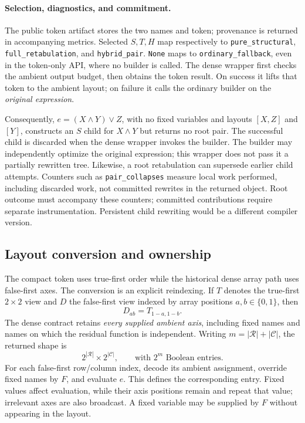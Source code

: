 \documentclass[10pt]{article}
\theoremstyle{plain}
\theoremstyle{definition}
\theoremstyle{remark}
\begin{document}
\paragraph{Selection, diagnostics, and commitment.}
The public token artifact stores the two names and token; provenance is returned in accompanying metrics. Selected $S,T,H$ map respectively to \texttt{pure\_structural}, \texttt{full\_retabulation}, and \texttt{hybrid\_pair}. \texttt{None} maps to \texttt{ordinary\_fallback}, even in the token-only API, where no builder is called. The dense wrapper first checks the ambient output budget, then obtains the token result. On success it lifts that token to the ambient layout; on failure it calls the ordinary builder on the \emph{original expression}.

Consequently, $e=(X\land Y)\lor Z$, with no fixed variables and layouts $[X,Z]$ and $[Y]$, constructs an $S$ child for $X\land Y$ but returns no root pair. The successful child is discarded when the dense wrapper invokes the builder. The builder may independently optimize the original expression; this wrapper does not pass it a partially rewritten tree. Likewise, a root retabulation can supersede earlier child attempts. Counters such as \texttt{pair\_collapses} measure local work performed, including discarded work, not committed rewrites in the returned object. Root outcome must accompany these counters; committed contributions require separate instrumentation. Persistent child rewriting would be a different compiler version.

\subsection{Layout conversion and ownership}

The compact token uses true-first order while the historical dense array path uses false-first axes. The conversion is an explicit reindexing. If $T$ denotes the true-first $2\times2$ view and $D$ the false-first view indexed by array positions $a,b\in\{0,1\}$, then
\begin{equation}
 D_{ab}=T_{1-a,1-b}.
 \label{eq:layout-conversion}
\end{equation}
The dense contract retains \emph{every supplied ambient axis}, including fixed names and names on which the residual function is independent. Writing $m=|\mathcal R|+|\mathcal C|$, the returned shape is
\begin{equation}
 2^{|\mathcal R|}\times2^{|\mathcal C|},\qquad\text{with }2^m\text{ Boolean entries}.
 \label{eq:ambient-shape}
\end{equation}
For each false-first row/column index, decode its ambient assignment, override fixed names by $F$, and evaluate $e$. This defines the corresponding entry. Fixed values affect evaluation, while their axis positions remain and repeat that value; irrelevant axes are also broadcast. A fixed variable may be supplied by $F$ without appearing in the layout.
\end{document}
